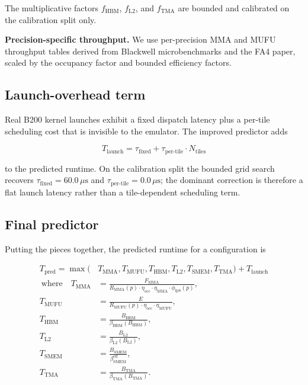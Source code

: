 \documentclass[
  11pt,
]{article}
\begin{document}
The multiplicative factors \(f_{\text{HBM}}\), \(f_{\text{L2}}\), and
\(f_{\text{TMA}}\) are bounded and calibrated on the calibration split
only.

\textbf{Precision-specific throughput.} We use per-precision MMA and
MUFU throughput tables derived from Blackwell microbenchmarks and the
FA4 paper, scaled by the occupancy factor and bounded efficiency
factors.

\subsection{Launch-overhead term}\label{launch-overhead-term}

Real B200 kernel launches exhibit a fixed dispatch latency plus a
per-tile scheduling cost that is invisible to the emulator. The improved
predictor adds

\[
T_{\text{launch}} = \tau_{\text{fixed}} + \tau_{\text{per-tile}} \cdot N_{\text{tiles}}
\]

to the predicted runtime. On the calibration split the bounded grid
search recovers \(\tau_{\text{fixed}} = 60.0\,\mu\text{s}\) and
\(\tau_{\text{per-tile}} = 0.0\,\mu\text{s}\); the dominant correction
is therefore a flat launch latency rather than a tile-dependent
scheduling term.

\subsection{Final predictor}\label{final-predictor}

Putting the pieces together, the predicted runtime for a configuration
is

\[
\begin{aligned}
T_{\text{pred}} = \max\bigl(&
T_{\text{MMA}},
T_{\text{MUFU}},
T_{\text{HBM}},
T_{\text{L2}},
T_{\text{SMEM}},
T_{\text{TMA}}
\bigr) + T_{\text{launch}} \\\
\text{where}\quad
T_{\text{MMA}} &= \frac{F_{\text{MMA}}}{R_{\text{MMA}}(p) \cdot \eta_{\text{occ}} \cdot \eta_{\text{MMA}} \cdot \phi_{\text{fp8}}(p)}, \\
T_{\text{MUFU}} &= \frac{E}{R_{\text{MUFU}}(p) \cdot \eta_{\text{occ}} \cdot \eta_{\text{MUFU}}}, \\
T_{\text{HBM}} &= \frac{B_{\text{HBM}}}{\beta_{\text{HBM}}(B_{\text{HBM}})}, \\
T_{\text{L2}} &= \frac{B_{\text{L2}}}{\beta_{\text{L2}}(B_{\text{L2}})}, \\
T_{\text{SMEM}} &= \frac{B_{\text{SMEM}}}{\beta_{\text{SMEM}}^{\text{eff}}}, \\
T_{\text{TMA}} &= \frac{B_{\text{TMA}}}{\beta_{\text{TMA}}(B_{\text{TMA}})}.
\end{aligned}
\]
\end{document}
